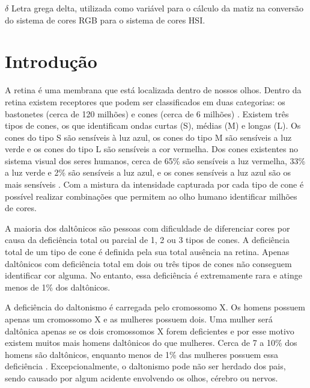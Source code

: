 \documentclass[	12pt, Times, openright, twoside, a4paper, english, brazil]{abntex2}
\begin{document}
\begin{simbolos}
  \item[$ \delta $] Letra grega delta, utilizada como variável para o cálculo da matiz na conversão do sistema de cores RGB para o sistema de cores HSI.
\end{simbolos}

\tableofcontents*
\cleardoublepage

\textual

\chapter{Introdução}

A retina é uma membrana que está localizada dentro de nossos olhos. Dentro da retina existem receptores que podem ser classificados em duas categorias: os bastonetes (cerca de 120 milhões) e cones (cerca de 6 milhões) \cite{koschan2008}. Existem três tipos de cones, os que identificam ondas curtas (S), médias (M) e longas (L). Os cones do tipo S são sensíveis à luz azul, os cones do tipo M são sensíveis a luz verde e os cones do tipo L são sensíveis a cor vermelha. Dos cones existentes no sistema visual dos seres humanos, cerca de 65\% são sensíveis a luz vermelha, 33\% a luz verde e 2\% são sensíveis a luz azul, e os cones sensíveis a luz azul são os mais sensíveis \cite{gonzalez2008}. Com a mistura da intensidade capturada por cada tipo de cone é possível realizar combinações que permitem ao olho humano identificar milhões de cores.

A maioria dos daltônicos são pessoas com dificuldade de diferenciar cores por causa da deficiência total ou parcial de 1, 2 ou 3 tipos de cones. A deficiência total de um tipo de cone é definida pela sua total ausência na retina. Apenas daltônicos com deficiência total em dois ou três tipos de cones não conseguem identificar cor alguma. No entanto, essa deficiência é extremamente rara e atinge menos de 1\% dos daltônicos.

A deficiência do daltonismo é carregada pelo cromossomo X. Os homens possuem apenas um cromossomo X e as mulheres possuem dois. Uma mulher será daltônica apenas se os dois cromossomos X forem deficientes e por esse motivo existem muitos mais homens daltônicos do que mulheres. Cerca de 7 a 10\% dos homens são daltônicos, enquanto menos de 1\% das mulheres possuem essa deficiência \cite{mcdowell2008}. Excepcionalmente, o daltonismo pode não ser herdado dos pais, sendo causado por algum acidente envolvendo os olhos, cérebro ou nervos.
\end{document}
